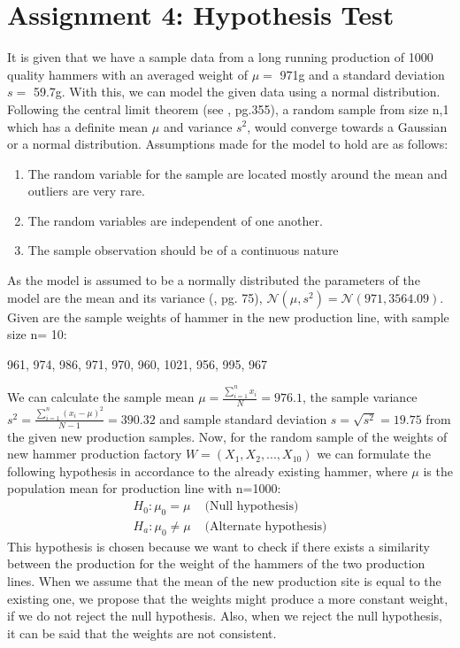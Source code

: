 \chapter{Assignment 4: Hypothesis Test}
It is given that we have a sample data from a long running production of 1000 quality hammers with an averaged weight of $\mu =$ 971g and a standard deviation $s= $ 59.7g. With this, we can model the given data using a normal distribution. Following the central limit theorem (see \cite{hogg:2005}, pg.355), a random sample from size n,1 which has a definite mean $\mu $ and variance $s^2$, would converge towards a Gaussian or a normal distribution. Assumptions made for the model to hold are as follows:
\begin{enumerate}
    \item The random variable for the sample are located mostly around the mean and outliers are very rare.
    \item The random variables are independent of one another.
    \item The sample observation should be of a continuous nature
\end{enumerate}
As the model is assumed to be a normally distributed the parameters of the model are the mean and its variance (\cite{Iubh:2021}, pg. 75), $\mathcal{N}(\mu, s^2) = \mathcal{N}(971, 3564.09)$.\newline
Given are the sample weights of hammer in the new production line, with sample size n= 10:
\begin{center}
    961, 974, 986, 971, 970, 960, 1021, 956, 995, 967
\end{center} 
We can calculate the sample mean $\mu = \frac{\sum_{i=1}^{n}x_i}{N}=976.1$, the sample variance $s^2=\frac{\sum_{i=1}^{n}(x_i-\mu)^2}{N-1} = 390.32$ and sample standard deviation $s=\sqrt{s^2}=19.75$ from the given new production samples.
Now, for the random sample of the weights of new hammer production factory $W = (X_1, X_2, ..., X_{10})$ we can formulate the following hypothesis in accordance to the already existing hammer, where $\mu$ is the population mean for production line with n=1000:\newline
\begin{equation}
    \begin{split}
      H_0 : \mu_0 = \mu& \text{ (Null hypothesis)}\\
      H_a: \mu_0 \neq \mu& \text{ (Alternate hypothesis)}
    \end{split}
\end{equation}
This hypothesis is chosen because we want to check if there exists a similarity between the production for the weight of the hammers of the two production lines. When we assume that the mean of the new production site is equal to the existing one, we propose that the weights might produce a more constant weight, if we do not reject the null hypothesis. Also, when we reject the null hypothesis, it can be said that the weights are not consistent.\newline\newline
